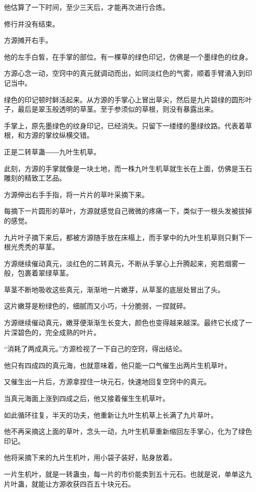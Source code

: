 \begin{this_body}
他估算了一下时间，至少三天后，才能再次进行合炼。

修行并没有结束。

方源摊开右手。

他的左手白皙，在手掌的部位。有一棵草的绿色印记，仿佛是一个墨绿色的纹身。

方源心念一动，空窍中的真元就调动而出，如同淡红色的气雾，顺着手臂涌入到印记当中。

绿色的印记顿时鲜活起来。从方源的手掌心上冒出草尖，然后是九片碧绿的圆形叶子，最后是翠玉般透明的草茎。至于参须似的草根，则没有暴露出来。

手掌上，原先墨绿色的纹身印记，已经消失。只留下一缕缕的墨绿纹路。代表着草根，和方源的掌纹纵横交错。

正是二转草蛊――九叶生机草。

此刻，方源的手掌就像是一块土地，而一株九叶生机草就生长在上面，仿佛是玉石雕刻的精致工艺品。

方源伸出右手手指，将一片片的草叶采摘下来。

每摘下一片圆形的草叶，方源就感觉自己微微的疼痛一下，类似于一根头发被拔掉的感觉。

九片叶子摘下来后，都被方源随手放在床榻上，而手掌中的九叶生机草则只剩下一根光秃秃的草茎。

方源继续催动真元，淡红色的二转真元，不断从手掌心上升腾起来，宛若烟雾一般，包裹着翠绿草茎。

草茎不断地吸收这些真元，渐渐地一片嫩芽，从草茎的底层处冒出了头。

这片嫩芽是粉绿色的，细腻而又小巧，十分脆弱，一捏就碎。

方源继续催动真元，嫩芽便渐渐生长变大，颜色也变得越来越深。最终它长成了一片深碧色的，完全成熟的叶片。

“消耗了两成真元。”方源检视了一下自己的空窍，得出结论。

他只有四成四的真元海，也就意味着，他只能一口气催生出两片生机草叶。

又催生出一片后，方源拿捏住一块元石，快速地回复空窍中的真元。

当真元海面上涨到四成之后，他又接着催生生机草叶。

如此循环往复，半天的功夫，他重新让九叶生机草上长满了九片草叶。

他不再采摘这上面的草叶，念头一动，九叶生机草重新缩回左手掌心，化为了绿色印记。

他将采摘下来的九片生机叶，用小袋子装好，贴身放着。

一片生机叶，就是一转蛊虫，每一片的市价能卖到五十元石。也就是说，单单这九片叶蛊，就能让方源收获四百五十块元石。


\end{this_body}
